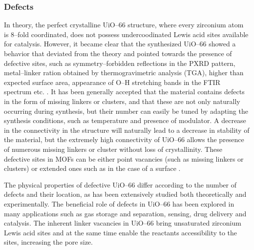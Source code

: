 \subsubsection*{Defects}
In theory, the perfect crystalline UiO--66 structure, where every zirconium atom is 8--fold coordinated, does not possess undercoodinated Lewis acid sites available for catalysis. However, it became clear that the synthesized UiO--66 showed a behavior that deviated from the theory and pointed towards the presence of defective sites, such as symmetry--forbidden reflections in the PXRD pattern, metal--linker ration obtained by thermogravimetric analysis (TGA), higher than expected surface area, appearance of O--H stretching bands in the FTIR spectrum etc. \cite{shearer2014tuned, valenzano2011disclosing}. It has been generally accepted that the material contains defects in the form of missing linkers or clusters, and that these are not only naturally occurring during synthesis, but their number can easily be tuned by adapting the synthesis conditions, such as temperature and presence of modulator\cite{wu2013unusual, shearer2016defect}. A decrease in the connectivity in the structure will naturally lead to a decrease in stability of the material, but the extremely high connectivity of UiO--66 allows the presence of numerous missing linkers or cluster without loss of crystallinity\cite{rogge2016thermodynamic}. 
These defective sites in MOFs can be either point vacancies (such as missing linkers or clusters) or extended ones such as in the case of a surface \cite{sholl2015defects}. 


The physical properties of defective UiO--66 differ according to the number of defects and their location, as has been extensively studied both theoretically and experimentally. The beneficial role of defects in UiO--66 has been explored in many applications such as gas storage and separation\cite{wu2013unusual, ren2014modulated}, sensing\cite{stassen2016towards}, drug delivery\cite{cunha2013rationale} and catalysis\cite{vermoortele2013synthesis, rogge2017metal}. The inherent linker vacancies in UiO--66 bring unsaturated zirconium Lewis acid sites and at the same time enable the reactants accessibility to the sites, increasing the pore size. 

